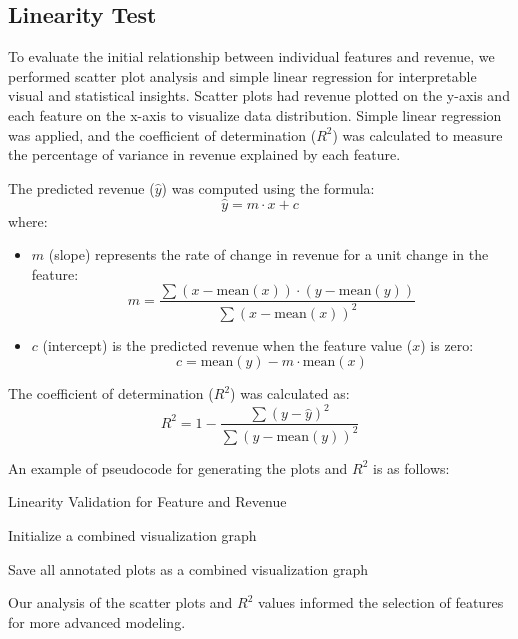 \documentclass{article}
\begin{document}
\subsection{Linearity Test}
To evaluate the initial relationship between individual features and revenue, we performed scatter plot analysis and simple linear regression for interpretable visual and statistical insights. Scatter plots had revenue plotted on the y-axis and each feature on the x-axis to visualize data distribution. Simple linear regression was applied, and the coefficient of determination (\( R^2 \)) was calculated to measure the percentage of variance in revenue explained by each feature.

The predicted revenue (\( \hat{y} \)) was computed using the formula:\[\hat{y} = m \cdot x + c\]
where:
\begin{itemize}
    \item \( m \) (slope) represents the rate of change in revenue for a unit change in the feature:
    \[ m = \frac{\sum{(x - \text{mean}(x)) \cdot (y - \text{mean}(y))}}{\sum{(x - \text{mean}(x))^2}}\]
    \item \( c \) (intercept) is the predicted revenue when the feature value (\( x \)) is zero:\[c = \text{mean}(y) - m \cdot \text{mean}(x)\]
\end{itemize}

The coefficient of determination (\( R^2 \)) was calculated as:
\[R^2 = 1 - \frac{\sum{(y - \hat{y})^2}}{\sum{(y - \text{mean}(y))^2}}\]

An example of pseudocode for generating the plots and \( R^2 \) is as follows:
\begin{algorithm}[H]
\caption{Linearity Validation for Feature and Revenue}\label{alg:linearity}
Initialize a combined visualization graph\;

Save all annotated plots as a combined visualization graph\;
\end{algorithm}

Our analysis of the scatter plots and \( R^2 \) values informed the selection of features for more advanced modeling.
\end{document}
